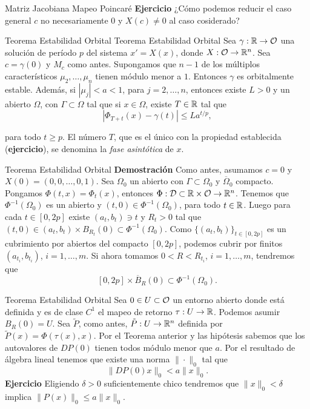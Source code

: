 {Matriz Jacobiana Mapeo Poincaré}
\textbf{Ejercicio} ¿Cómo podemos reducir el caso general $c$ no necesariamente $0$ y $X(c)\neq 0$ al caso cosiderado? 



{Teorema Estabilidad Orbital}
{Teorema Estabilidad Orbital} 
 Sea $\gamma:\mathbb{R}\to\mathcal{O}$ una solución de período $p$ del sistema $x'=X(x)$, donde $X:\mathcal{O}\to \mathbb{R}^n$. Sea $c=\gamma(0)$ y $M_c$ como antes. Supongamos que $n-1$ de los múltiplos 
 característicos $\mu_2,\ldots,\mu_n$ tienen módulo menor a $1$. Entonces $\gamma$ es orbitalmente estable. Además, si $|\mu_j|<a<1$, para $j=2,\ldots,n$, entonces 
 existe $L>0$ y un abierto $\Omega$, con $\Gamma\subset\Omega$ tal que si $x\in\Omega$, existe $T\in\mathbb{R}$ tal que
 \begin{equation}\label{est_asi}
  |\Phi_{T+t}(x)-\gamma(t)|\leq La^{t/p},
 \end{equation}

 para todo $t\geq p$. El número $T$, que es  el único con la propiedad establecida (\textbf{ejercicio}), se denomina la \emph{fase asintótica} de $x$.
 






{Teorema Estabilidad Orbital}
\textbf{Demostración} Como antes, asumamos $c=0$ y $X(0)=(0,0,\ldots,0,1)$. Sea $\Omega_0$ un abierto con $\Gamma\subset\Omega_0$ y $\overline{\Omega}_0$ compacto. Pongamos
$\Phi(t,x)=\Phi_t(x)$, entonces $\Phi:\mathcal{D}\subset\mathbb{R}\times \mathcal{O}\to\mathbb{R}^n$. Tenemos que $\Phi^{-1}(\Omega_0)$ es un abierto y $(t,0)\in\Phi^{-1}(\Omega_0)$, para todo 
$t\in\mathbb{R}$. Luego para cada $t\in[0,2p]$ existe $(a_t,b_t)\ni t$ y $R_t>0$ tal que $(t,0)\in(a_t,b_t)\times B_{R_t}(0)\subset\Phi^{-1}(\Omega_0)$. Como $\{(a_t,b_t)\}_{t\in[0,2p]}$
es un cubrimiento por abiertos del compacto $[0,2p]$, podemos cubrir por finitos $(a_{t_i},b_{t_i})$, $i=1,\ldots,m$. Si ahora tomamos $0<R< R_{t_i}$, $i=1,\ldots,m$, 
tendremos que
\[[0,2p]\times\overline{B}_{R}(0)\subset\Phi^{-1}(\Omega_0).\]





{Teorema Estabilidad Orbital}
Sea $0\in U\subset\mathcal{O}$ un entorno abierto donde está definida y es de clase $C^1$ el mapeo de retorno $\tau:U\to\mathbb{R}$. Podemos asumir $B_R(0)= U$. Sea $\tilde{P}$, como antes, 
$\tilde{P}:U\to\mathbb{R}^n$ definida por $\tilde{P}(x)=\Phi(\tau(x),x)$. Por el Teorema anterior y las hipótesis sabemos que los autovalores de $DP(0)$ tienen todos módulo menor que
$a$. Por el resultado de álgebra lineal tenemos que existe una norma $\|\cdot\|_0$ tal que
\[\|DP(0)x\|_0<a\|x\|_0.\]
\textbf{Ejercicio} Eligiendo $\delta>0$ suficientemente chico tendremos que  $\|x\|_0<\delta$ implica $\|P(x)\|_0\leq a\|x\|_0$. 

